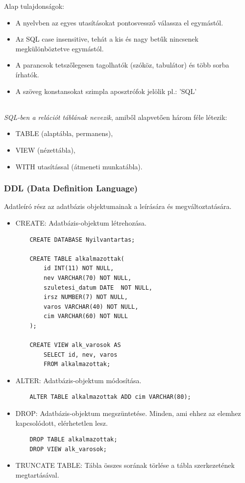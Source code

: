 \documentclass[tikz,12pt,margin=0px]{article}
\begin{document}
    \noindent Alap tulajdonságok:
    \begin{itemize}
        \item A nyelvben az egyes utasításokat pontosvessző válassza el egymástól.
        \item Az SQL case insensitive, tehát a kis és nagy betűk nincsenek megkülönböztetve egymástól.
        \item A parancsok tetszőlegesen tagolhatók (szóköz, tabulátor) és több sorba írhatók.
        \item A szöveg konstansokat szimpla aposztrófok jelölik pl.: 'SQL'
    \end{itemize}

    \ \\

	\noindent \emph{SQL-ben a relációt táblának nevezik}, amiből alapvetően három féle létezik:
    \begin{itemize}
        \item TABLE (alaptábla, permanens),
        \item VIEW (nézettábla),
        \item WITH utasítással (átmeneti munkatábla).
    \end{itemize}

	\subsubsection*{DDL (Data Definition Language)}

   \noindent Adatleíró rész az adatbázis objektumainak a leírására és megváltoztatására.

	\begin{itemize}
		\item CREATE: Adatbázis-objektum létrehozása.
{\small
        \begin{verbatim}
    CREATE DATABASE Nyilvantartas;

    CREATE TABLE alkalmazottak(
        id INT(11) NOT NULL,
        nev VARCHAR(70) NOT NULL,
        szuletesi_datum DATE  NOT NULL,
        irsz NUMBER(7) NOT NULL,
        varos VARCHAR(40) NOT NULL,
        cim VARCHAR(60) NOT NULL
    );

    CREATE VIEW alk_varosok AS
        SELECT id, nev, varos
        FROM alkalmazottak;
        \end{verbatim}
}
	   \item ALTER: Adatbázis-objektum módosítása.
        \begin{verbatim}
    ALTER TABLE alkalmazottak ADD cim VARCHAR(80);
        \end{verbatim}
	   \item DROP: Adatbázis-objektum megszüntetése. Minden, ami ehhez az elemhez kapcsolódott, elérhetetlen lesz.
        \begin{verbatim}
    DROP TABLE alkalmazottak;
    DROP VIEW alk_varosok;
        \end{verbatim}
        \item TRUNCATE TABLE: Tábla összes sorának törlése a tábla szerkezetének megtartásával.
	\end{itemize}
\end{document}
